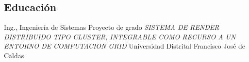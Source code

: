 \documentclass[overlapped,line,final]{res}
\begin{document}
\begin{resume}
%
%
%

\section{\sc Educación}
\vspace{0.5cm}
Ing., Ingeniería de Sistemas
\newline Proyecto de grado \textit{SISTEMA DE RENDER DISTRIBUIDO TIPO CLUSTER, INTEGRABLE COMO RECURSO A UN ENTORNO DE COMPUTACION GRID}
\newline Universidad Distrital Francisco José de Caldas

\vspace{0.25cm}


\end{resume}
\end{document}

